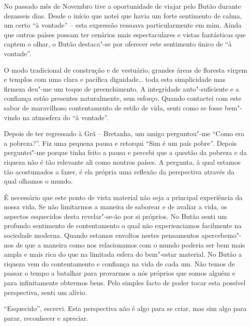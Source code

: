 No passado mês de Novembro tive a oportunidade de viajar pelo Butão
durante dezasseis dias. Desde o início que notei que havia um forte
sentimento de calma, um certo ``à vontade'' -- esta expressão ressoava
particularmente em mim. Ainda que outros países possam ter cenários mais
espectaculares e vistas fantásticas que captem o olhar, o Butão
destaca"-se por oferecer este sentimento único de ``à vontade''.

O modo tradicional de construção e de vestuário, grandes áreas de
floresta virgem e templos com uma clara e pacífica dignidade\ldots{}
toda esta simplicidade mas firmeza deu"-me um toque de preenchimento. A
integridade auto"-suficiente e a confiança estão presentes naturalmente,
sem esforço. Quando contactei com este sabor de maravilhoso
contentamento de estilo de vida, senti como se fosse bem"-vindo na
atmosfera do ``à vontade''.

Depois de ter regressado à Grã -- Bretanha, um amigo perguntou"-me ``Como
era a pobreza?''. Fiz uma pequena pausa e retorqui ``Sim é um país
pobre''. Depois perguntei"-me porque tinha feito a pausa e percebi que a
questão da pobreza e da riqueza não é tão relevante ali como noutros
países. A pergunta, à qual estamos tão acostumados a fazer, é ela
própria uma reflexão da perspectiva através da qual olhamos o mundo.

É necessário que este ponto de vista material não seja a principal
experiência da nossa vida. Se não limitarmos a maneira de saborear e de
avaliar a vida, os aspectos esquecidos desta revelar"-se-ão por si
próprios. No Butão senti um profundo sentimento de contentamento o qual
não experienciamos facilmente na sociedade moderna. Quando estamos
envoltos nestes pensamentos apercebemo"-nos de que a maneira como nos
relacionamos com o mundo poderia ser bem mais ampla e mais rica do que
na limitada esfera do bem"-estar material. No Butão a riqueza vem do
contentamento e confiança na vida de cada um. Não temos de passar o
tempo a batalhar para provarmos a nós próprios que somos alguém e para
infinitamente obtermos bens. Pelo simples facto de poder tocar esta
possível perspectiva, senti um alívio.

``Esquecido'', escrevi. Esta perspectiva não é algo para se criar, mas
sim algo para parar, reconhecer e apreciar.

